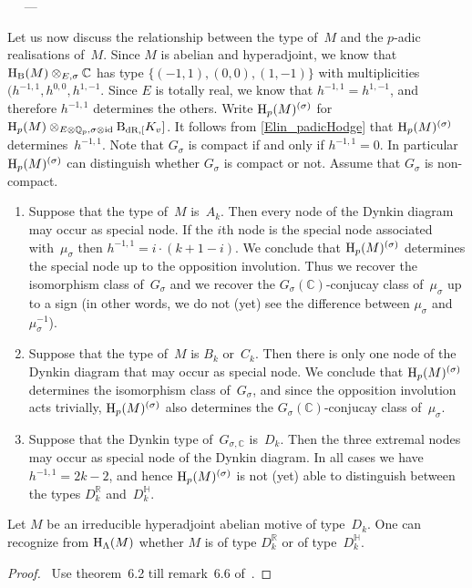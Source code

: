 \documentclass[10pt,twoside,leqno]{article}
\renewcommand{\paragraph}[1]{\par\bigskip\refstepcounter{subsection}%
 {\normalfont\normalsize\scshape\noindent\thesubsection%
 \ifthenelse{\equal{#1}{}}%
 {}%
 {\ \textls{#1.}}%
 \ ---}%
}
\numberwithin{equation}{subsection}
\let\qed\relax
\newcommand{\id}{\textnormal{id}}
\newcommand{\QQ}{\mathbb{Q}}
\newcommand{\QQp}{\QQ_{p}}
\newcommand{\RR}{\mathbb{R}}
\newcommand{\CC}{\mathbb{C}}
\newcommand{\HQ}{\mathbb{H}}
\newcommand{\BdR}[1]{\textnormal{B}_{\dR,#1}}
\newcommand{\dR}{\textnormal{dR}}
\newcommand{\HH}{\textnormal{H}}
\newcommand{\Hp}{\HH_{p}}
\newcommand{\HB}{\HH_{\textnormal{B}}}
\begin{document}
\paragraph{}
Let us now discuss the relationship between the type of~\(M\)
and the \(p\)-adic realisations of~\(M\).
Since \(M\) is abelian and hyperadjoint,
we know that \(\HB(M) \otimes_{E,\sigma} \CC\)
has type \(\{(-1,1), (0,0), (1,-1)\}\) with multiplicities
\((h^{-1,1},h^{0,0},h^{1,-1}\).
Since \(E\) is totally real, we know that \(h^{-1,1} = h^{1,-1}\),
and therefore \(h^{-1,1}\) determines the others.
Write \(\Hp(M)^{(\sigma)}\) for
\(\Hp(M) \otimes_{E \otimes \QQp, \sigma \otimes \id} \BdR[K_{v}]\).
It follows from \cref{Elin_padicHodge}
that \(\Hp(M)^{(\sigma)}\) determines~\(h^{-1,1}\).
Note that \(G_{\sigma}\) is compact if and only if \(h^{-1,1} = 0\).
In particular \(\Hp(M)^{(\sigma)}\) can distinguish whether
\(G_{\sigma}\) is compact or not.
Assume that \(G_{\sigma}\) is non-compact.
\begin{enumerate}
 \item Suppose that the type of~\(M\) is~\(A_{k}\).
  Then every node of the Dynkin diagram may occur as special node.
  If the \(i\)th node is the special node associated with~\(\mu_{\sigma}\)
  then \(h^{-1,1} = i\cdot(k+1-i)\).
  We conclude that \(\Hp(M)^{(\sigma)}\)
  determines the special node up to the opposition involution.
  Thus we recover the isomorphism class of~\(G_{\sigma}\)
  and we recover the \(G_{\sigma}(\CC)\)-conjucay class of~\(\mu_{\sigma}\)
  up to a sign (in other words, we do not (yet)
  see the difference between \(\mu_{\sigma}\) and~\(\mu_{\sigma}^{-1}\)).
 \item Suppose that the type of~\(M\) is \(B_{k}\) or~\(C_{k}\).
  Then there is only one node of the Dynkin diagram
  that may occur as special node.
  We conclude that \(\Hp(M)^{(\sigma)}\) determines
  the isomorphism class of~\(G_{\sigma}\),
  and since the opposition involution acts trivially,
  \(\Hp(M)^{(\sigma)}\) also determines
  the \(G_{\sigma}(\CC)\)-conjucay class of~\(\mu_{\sigma}\).
 \item Suppose that the Dynkin type of~\(G_{\sigma,\CC}\) is~\(D_{k}\).
  Then the three extremal nodes may occur as special node of the Dynkin diagram.
  In all cases we have \(h^{-1,1} = 2k-2\),
  and hence \(\Hp(M)^{(\sigma)}\) is not (yet) able to distinguish
  between the types \(D_{k}^{\RR}\) and~\(D_{k}^{\HQ}\).
\end{enumerate}

\begin{proposition} \label{inputNoot}
 Let \(M\) be an irreducible hyperadjoint abelian motive of type~\(D_{k}\).
 One can recognize from \(\HH_{\Lambda}(M)\)
 whether \(M\) is of type \(D_{k}^{\RR}\) or of type~\(D_{k}^{\HQ}\).
\end{proposition}
\begin{proof}
 \pf\ Use theorem~6.2 till remark~6.6 of~\cite{No06}. \qed
\end{proof}
\end{document}
